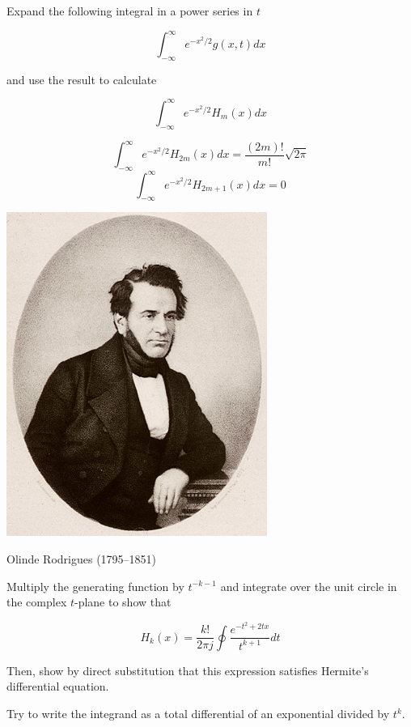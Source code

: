 \pagebreak

\begin{exer}
Expand the following integral in a power series in $t$

$$ \int_{-\infty}^{\infty} e^{-x^2/2} g(x,t) dx$$

and use the result to calculate

$$\int_{-\infty}^{\infty} e^{-x^2/2} H_{m}(x) dx $$

\begin{sol}
$$\int_{-\infty}^{\infty} e^{-x^2/2} H_{2m}(x) dx = \frac{(2m)!}{m!} \sqrt{2\pi} $$
$$\int_{-\infty}^{\infty} e^{-x^2/2} H_{2m+1}(x) dx = 0 $$
\end{sol}
\end{exer}

\begin{marginfigure}[5.0cm]
  \includegraphics{hermite/figures/o_rodrigues}
  \caption{Olinde Rodrigues (1795–1851)}
  \end{marginfigure}

\begin{exer}
Multiply the generating function by $t^{-k-1}$ and integrate over the unit circle in the complex $t$-plane to show that

$$H_k(x) =\frac{k!}{2 \pi j} \oint \frac{e^{-t^2 +2tx}}{t^{k+1}}dt $$

Then, show by direct substitution that this expression satisfies Hermite's differential equation.

\begin{hnt}
  Try to write the integrand as a total differential of an exponential divided by $t^k$.
\end{hnt}
    
\end{exer}



